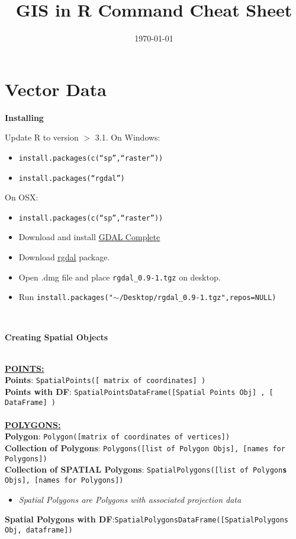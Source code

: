 \documentclass[10pt]{article}
\title{GIS in R Command Cheat Sheet}
\date{\today}
\begin{document}
 
\maketitle
	
\section*{Vector Data}
\centerline{\textbf{Installing}}
Update R to version $>$ 3.1.
On Windows:
\begin{itemize}
	\item \texttt{install.packages(c(``sp'',``raster''))}
	\item \texttt{install.packages(``rgdal'')}
\end{itemize}
On OSX:
	\begin{itemize}
		\item \texttt{install.packages(c(``sp'',``raster''))}
		\item Download and install 	\href{http://www.kyngchaos.com/files/software/frameworks/GDAL_Complete-1.11.dmg}{\underline{GDAL Complete}}
		\item Download \href{http://www.kyngchaos.com/files/software/frameworks/rgdal-0.9.1-1.dmg}{\underline{rgdal}} package. 
		\item Open .dmg file and place \texttt{rgdal\_0.9-1.tgz} on desktop.
		\item Run \texttt{install.packages("$\sim$/Desktop/rgdal\_0.9-1.tgz",repos=NULL)}
	\end{itemize}

\hrulefill \\ 
\centerline{\textbf{Creating Spatial Objects}} \\
\underline{\textbf{POINTS:}}\\
\textbf{Points}: \texttt{SpatialPoints([ matrix of coordinates] )}\\
\textbf{Points with DF}: \texttt{SpatialPointsDataFrame([Spatial Points Obj] , [ DataFrame] )}\\
\\
\underline{\textbf{POLYGONS:}}\\
\textbf{Polygon}: \texttt{Polygon([matrix of coordinates of vertices])}\\
\textbf{Collection of Polygons}: \texttt{Polygons([list of Polygon Objs], [names for Polygons])}\\
\textbf{Collection of SPATIAL Polygons}: \texttt{SpatialPolygons([list of Polygon\textbf{s} Objs], [names for Polygons])}
\begin{itemize}
	\item \emph{Spatial Polygons are Polygons with associated projection data}
\end{itemize}
\textbf{Spatial Polygons with DF}:\texttt{SpatialPolygonsDataFrame([SpatialPolygons Obj, dataframe])}
\end{document}
